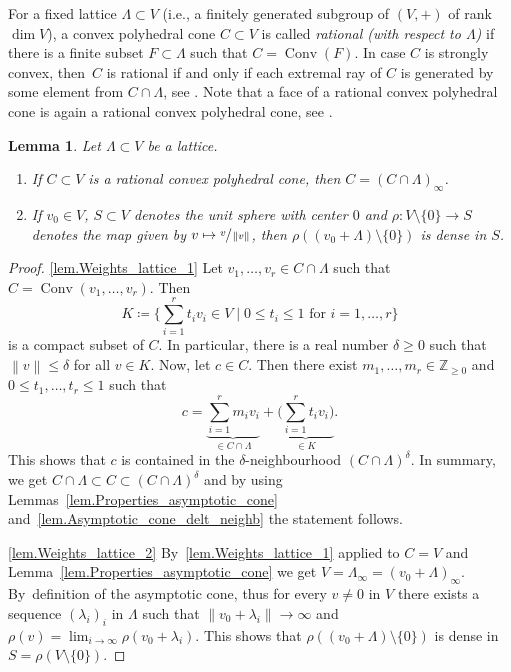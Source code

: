 \documentclass[11pt]{article}
\newcommand{\ie}{i.e.,\xspace}
\newcommand{\skpt}{\smallskip}
\numberwithin{equation}{section}
\def\mto{\mathchoice{\longmapsto}{\mapsto}{\mapsto}{\mapsto}}
\theoremstyle{plain}
\newtheorem{lemma}[theorem]{Lemma}
\theoremstyle{definition}
\DeclareMathOperator{\Conv}{Conv}
\newcommand{\norm}[1]{\left\lVert#1\right\rVert}
\newcommand{\ZZ}{\mathbb{Z}}
\newcommand{\bset}[2]{\bigl\{#1 \mid #2\bigr\}}
\begin{document}
For a fixed lattice $\Lambda \subset V$ (\ie a finitely generated subgroup of $(V, +)$ of rank $\dim V$),
a convex polyhedral cone $C \subset V$
is called \emph{rational (with respect to $\Lambda$)} if there is a finite subset $F \subset \Lambda$
such that $C = \Conv(F)$. In case $C$ is strongly convex, then~$C$ is rational if and only if
each extremal ray of $C$ is generated
by some element from $C \cap \Lambda$, see \cite[p.\,14]{Fu1993Introduction-to-to}.
Note that a face of a rational convex polyhedral cone
is again a rational convex polyhedral cone, see \cite[Prop.\,2]{Fu1993Introduction-to-to}.

\begin{lemma}
\label{lem.Weights_lattice}
Let $\Lambda \subset V$ be a lattice.
\begin{enumerate}
\item \label{lem.Weights_lattice_1} If $C \subset V$ is a rational convex
polyhedral cone, then $C = (C \cap \Lambda)_{\infty}$.
\item \label{lem.Weights_lattice_2} If $v_0 \in V$, $S \subset V$ denotes the unit sphere with center $0$ and
$\rho \colon V \setminus \{0\} \to S$ denotes the map given by $v \mto \sfrac{v}{\norm{v}}$,
then $\rho((v_0 + \Lambda) \setminus \{0\})$ is dense in $S$.
\end{enumerate}
\end{lemma}

\skpt
\begin{proof}
\eqref{lem.Weights_lattice_1}
Let $v_1, \ldots, v_r \in C \cap \Lambda$ such that $C = \Conv(v_1, \ldots, v_r)$. Then
\[
K\coloneqq\bset{\textstyle\sum_{i=1}^r t_i v_i \in V}{\textrm{$0 \leq t_i \leq 1$ for $i=1, \ldots, r$}}
\]
is a compact subset of $C$. In particular, there is a real number $\delta \geq 0$ such that
$\norm{v} \leq \delta$ for all $v \in K$. Now, let $c \in C$. Then there exist
$m_1, \ldots, m_r \in \ZZ_{\geq 0}$ and $0 \leq t_1, \ldots, t_r \leq 1$ such that
\[
c = \underbrace{\sum_{i=1}^r m_i v_i}_{\in C \cap \Lambda} +
\underbrace{\biggl(\sum_{i=1}^r t_i v_i \biggr)}_{\in K}.
\]
This shows that $c$ is contained in the $\delta$-neighbourhood $(C \cap \Lambda)^\delta$. In
summary, we get $C \cap \Lambda \subset C \subset (C \cap \Lambda)^\delta$ and by
using Lemmas~\ref{lem.Properties_asymptotic_cone} and~\ref{lem.Asymptotic_cone_delt_neighb}
the statement follows.

\eqref{lem.Weights_lattice_2}
By~\eqref{lem.Weights_lattice_1} applied to $C = V$ and
Lemma~\ref{lem.Properties_asymptotic_cone} we get
$V = \Lambda_{\infty} = (v_0 + \Lambda)_{\infty}$. By~definition of the asymptotic cone, thus
for every $v \neq 0$ in $V$ there exists a sequence $(\lambda_i)_i$ in $\Lambda$ such that
$\norm{v_0 + \lambda_i} \to \infty$ and
$\rho(v) = \lim_{i \to \infty} \rho(v_0 + \lambda_i)$.
This shows that $\rho((v_0 + \Lambda) \setminus \{0\})$ is dense in $S = \rho(V \setminus \{0\})$.
\end{proof}
\end{document}
